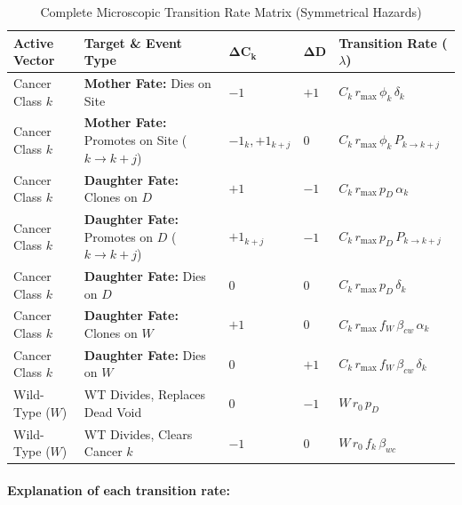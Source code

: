 \documentclass[11pt,a4paper]{article}
\begin{document}
\begin{table}[htbp]
\centering
\caption{Complete Microscopic Transition Rate Matrix (Symmetrical Hazards)}
\label{tab:transitions}
\begin{tabular}{lllll}
\toprule
\textbf{Active Vector} & \textbf{Target \& Event Type} & $\mathbf{\Delta C_k}$ & $\mathbf{\Delta D}$ & \textbf{Transition Rate ($\lambda$)} \\
\midrule
Cancer Class $k$ & \textbf{Mother Fate:} Dies on Site & $-1$ & $+1$ & $C_k \, r_{\text{max}} \, \phi_k \, \delta_k$ \\
Cancer Class $k$ & \textbf{Mother Fate:} Promotes on Site ($k \to k+j$) & $-1_{k}, +1_{k+j}$ & $0$ & $C_k \, r_{\text{max}} \, \phi_k \, P_{k \to k+j}$ \\
Cancer Class $k$ & \textbf{Daughter Fate:} Clones on $D$ & $+1$ & $-1$ & $C_k \, r_{\text{max}} \, p_D \, \alpha_k$ \\
Cancer Class $k$ & \textbf{Daughter Fate:} Promotes on $D$ ($k \to k+j$) & $+1_{k+j}$ & $-1$ & $C_k \, r_{\text{max}} \, p_D \, P_{k \to k+j}$ \\
Cancer Class $k$ & \textbf{Daughter Fate:} Dies on $D$ & $0$ & $0$ & $C_k \, r_{\text{max}} \, p_D \, \delta_k$ \\
Cancer Class $k$ & \textbf{Daughter Fate:} Clones on $W$ & $+1$ & $0$ & $C_k \, r_{\text{max}} \, f_W \, \beta_{cw} \, \alpha_k$ \\
Cancer Class $k$ & \textbf{Daughter Fate:} Dies on $W$ & $0$ & $+1$ & $C_k \, r_{\text{max}} \, f_W \, \beta_{cw} \, \delta_k$ \\
Wild-Type ($W$) & WT Divides, Replaces Dead Void & $0$ & $-1$ & $W \, r_0 \, p_D$ \\
Wild-Type ($W$) & WT Divides, Clears Cancer $k$ & $-1$ & $0$ & $W \, r_0 \, f_k \, \beta_{wc}$ \\
\bottomrule
\end{tabular}
\end{table}

\paragraph{Explanation of each transition rate:}
\end{document}
